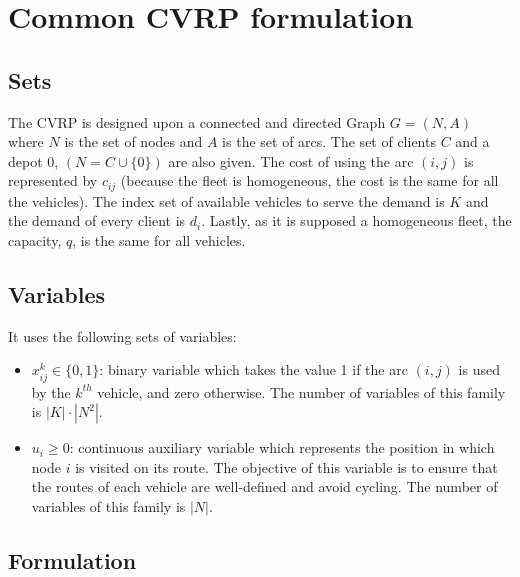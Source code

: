 \documentclass[preprint,review,12pt]{elsarticle}
\begin{document}
\section{Common CVRP formulation}

\subsection{Sets}
The CVRP is designed upon a connected and directed Graph $G = (N,A)$ where $N$ is the set of nodes and $A$ is the set of arcs. The set of clients $C$ and a depot $0$, $(N=C \cup \{0\})$ are also given. The cost of using the arc $(i,j)$ is represented by $c_{ij}$ (because the fleet is homogeneous, the cost is the same for all the vehicles). The index set of available vehicles to serve the demand is $K$ and the demand of every client is $d_i$. Lastly, as it is supposed a homogeneous fleet, the capacity, $q$, is the same for all vehicles.

\subsection{Variables}
It uses the following sets of variables:

\begin{itemize}
	\item  $x_{ij}^{k}  \in  \{ 0,1 \}$: binary variable which takes the value 1 if the arc $(i,j)$ is used by the $k^{th}$ vehicle, and zero otherwise. The number of variables of this family is $|K|\cdot|N^2|$.
	\item $u_i \geq 0$: continuous auxiliary variable which represents the position in which node $i$ is visited on its route. The objective of this variable is to ensure that the routes of each vehicle are well-defined and avoid cycling. The number of variables of this family is $|N|$.
\end{itemize}

\subsection{Formulation}
\end{document}
